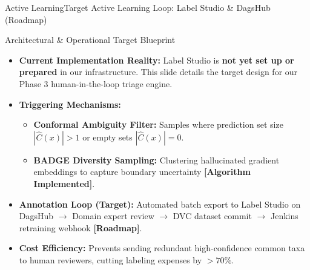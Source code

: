 \begin{frame}{Active Learning}{Target Active Learning Loop: Label Studio \& DagsHub (Roadmap)}
    \begin{block}{Architectural \& Operational Target Blueprint}
        \begin{itemize}\small
            \item \textbf{Current Implementation Reality:} Label Studio is \textbf{not yet set up or prepared} in our infrastructure. This slide details the target design for our Phase 3 human-in-the-loop triage engine.
            \item \textbf{Triggering Mechanisms:}
            \begin{itemize}\footnotesize
                \item \textbf{Conformal Ambiguity Filter:} Samples where prediction set size $|\hat{C}(x)| > 1$ or empty sets $|\hat{C}(x)| = 0$.
                \item \textbf{BADGE Diversity Sampling:} Clustering hallucinated gradient embeddings to capture boundary uncertainty \textcolor{plantgreen}{\textbf{[Algorithm Implemented]}}.
            \end{itemize}
            \item \textbf{Annotation Loop (Target):} Automated batch export to Label Studio on DagsHub $\to$ Domain expert review $\to$ DVC dataset commit $\to$ Jenkins retraining webhook \textcolor{deepblue}{\textbf{[Roadmap]}}.
            \item \textbf{Cost Efficiency:} Prevents sending redundant high-confidence common taxa to human reviewers, cutting labeling expenses by $> 70\%$.
        \end{itemize}
    \end{block}

    \vspace{0.15cm}
    \statustarget

\end{frame}

